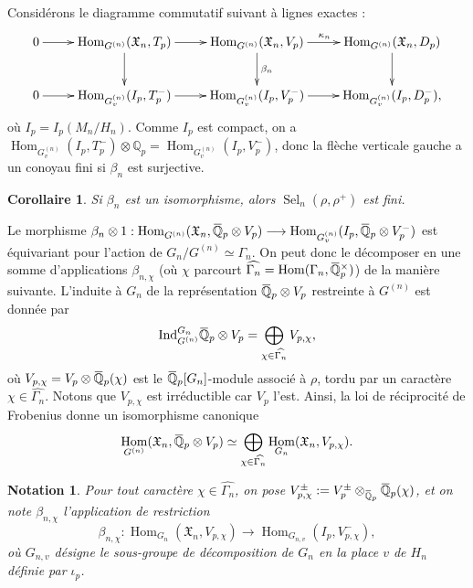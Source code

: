 \documentclass[12pt]{amsart}
\newcommand\bQ{\mathbb{Q}}
\newcommand\Qp{\mathbb{Q}_{p}}
\newcommand\gX{\mathfrak{X}}
\newcommand{\ob}[1]{\mkern 1.5mu\overline{\mkern-1.5mu#1\mkern-1.5mu}\mkern 1.5mu}
\newcommand{\Ind}{\mathrm{Ind}}
\DeclareMathOperator{\Hom}{Hom}
\DeclareMathOperator{\Sel}{Sel}
\theoremstyle{defstyle}
\newtheorem{notation}[subsubsection]{Notation}
\theoremstyle{thmstyle}
\newtheorem{corollaire}[subsubsection]{Corollaire}
\begin{document}
Considérons le diagramme commutatif suivant à lignes exactes :
$$\xymatrix{
	0 \ar[r] & \Hom_{G^{(n)}}(\gX_n,T_p) \ar[r] \ar[d] & \Hom_{G^{(n)}}(\gX_n,V_p) \ar[r]^{\kappa_n} \ar[d]^{\beta_n} & \Hom_{G^{(n)}}(\gX_n,D_p)  \ar[d]  \\
	0 \ar[r] & \Hom_{G^{(n)}_v}(I_p,T_p^-) \ar[r]  & \Hom_{G^{(n)}_v}(I_p,V_p^-) \ar[r]  & \Hom_{G^{(n)}_v}(I_p,D_p^-), 
}$$
où $I_p=I_p(M_n/H_n)$. Comme $I_p$ est compact, on a $\Hom_{G^{(n)}_v}(I_p,T_p^-) \otimes \Qp = \Hom_{G^{(n)}_v}(I_p,V_p^-)$, donc la flèche verticale gauche a un conoyau fini si $\beta_n$ est surjective.

\begin{corollaire}\label{coro:beta_n_isom?}
	Si $\beta_n$ est un isomorphisme, alors $\Sel_n(\rho,\rho^+)$ est fini.
\end{corollaire}

Le morphisme $\beta_n \otimes 1 : \Hom_{G^{(n)}}(\gX_n,\ob{\bQ}_p \otimes V_p) \longrightarrow \Hom_{G^{(n)}_v}({I_p},\ob{\bQ}_p\otimes V_p^-) $ est équivariant pour l'action de $G_n / G^{(n)} \simeq\Gamma_n$. On peut donc le décomposer en une somme d'applications $\beta_{n,\chi}$ (où $\chi$ parcourt $\widehat{\Gamma_n}=\Hom(\Gamma_n,\ob{\bQ}_p^\times)$) de la manière suivante. L'induite à $G_n$ de la représentation $\ob{\bQ}_p \otimes V_p$ restreinte à $G^{(n)}$ est donnée par
\begin{equation}\label{eq:decomposition_induite}
\Ind_{G^{(n)}}^{G_n}\ob{\bQ}_p \otimes V_p = \bigoplus_{\chi \in \widehat{\Gamma_n}} V_{p,\chi},
\end{equation}
où $V_{p,\chi} = V_p\otimes \ob{\bQ}_p(\chi)$ est le $\ob{\bQ}_p[G_n]$-module associé à $\rho$, tordu par un caractère $\chi \in\widehat{\Gamma_n}$. Notons que $V_{p,\chi}$ est irréductible car $V_p$ l'est. Ainsi, la loi de réciprocité de Frobenius donne un isomorphisme canonique 
$$\Hom_{G^{(n)}}(\gX_n,\ob{\bQ}_p \otimes V_p) \simeq \bigoplus_{\chi \in \widehat{\Gamma_n}} \Hom_{G_n}(\gX_n,V_{p,\chi}).$$ 

\begin{notation}\label{nota:beta_n_chi}
	Pour tout caractère $\chi\in\widehat{\Gamma_n}$, on pose $V_{p,\chi}^\pm:= V_p^\pm \otimes_{\ob{\bQ}_p} \ob{\bQ}_p(\chi) $, et on note $\beta_{n,\chi}$ l'application de restriction 
	$$ \beta_{n,\chi} : \Hom_{G_n}(\gX_n,V_{p,\chi}) \longrightarrow \Hom_{G_{n,v}}({I_p},V_{p,\chi}^-),$$
	où $G_{n,v}$ désigne le sous-groupe de décomposition de $G_{n}$ en la place $v$ de $H_n$ définie par $\iota_p$. 
\end{notation}
\end{document}

